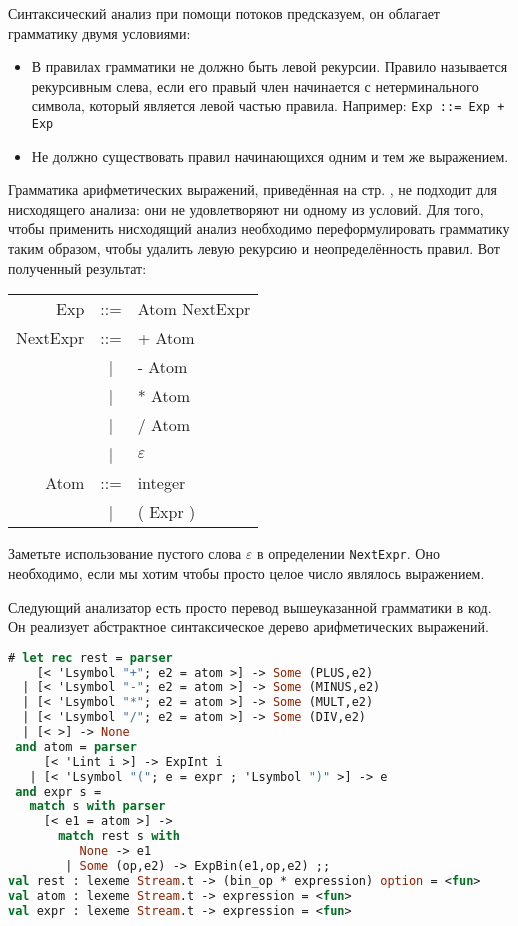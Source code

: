 Синтаксический анализ при помощи потоков предсказуем, он облагает грамматику
двумя условиями:

\begin{itemize}
	\item В правилах грамматики не должно быть левой рекурсии. Правило
называется рекурсивным слева, если его правый член начинается с нетерминального
символа, который является левой частью правила. Например: \texttt{Exp ::= Exp +
Exp}

	\item Не должно существовать правил начинающихся одним и тем же выражением.
\end{itemize}

Грамматика арифметических выражений, приведённая на стр.
\pageref{page_ref:Production_and_Recognition}, не подходит для нисходящего
анализа: они не удовлетворяют ни одному из условий. Для того, чтобы применить
нисходящий анализ необходимо переформулировать грамматику таким образом, чтобы
удалить левую рекурсию и неопределённость правил. Вот полученный результат:

\begin{center}
	\begin{tabular}{rcl}
		Exp & ::= & Atom NextExpr \\
		NextExpr & ::= & + Atom \\
		 & | & - Atom \\
		 & | & * Atom \\
		 & | & / Atom \\
 		 & | & $\varepsilon$ \\
		 Atom & ::= & integer \\
		 & | & ( Expr )
	\end{tabular}
\end{center}

Заметьте использование пустого слова $\varepsilon$ в определении
\texttt{NextExpr}. Оно необходимо, если мы хотим чтобы просто целое число
являлось выражением.

Следующий анализатор есть просто перевод вышеуказанной грамматики в код. Он
реализует абстрактное синтаксическое дерево арифметических выражений.

\begin{lstlisting}[language=OCaml]
# let rec rest = parser
    [< 'Lsymbol "+"; e2 = atom >] -> Some (PLUS,e2)
  | [< 'Lsymbol "-"; e2 = atom >] -> Some (MINUS,e2)
  | [< 'Lsymbol "*"; e2 = atom >] -> Some (MULT,e2)
  | [< 'Lsymbol "/"; e2 = atom >] -> Some (DIV,e2)
  | [< >] -> None
 and atom = parser
     [< 'Lint i >] -> ExpInt i
   | [< 'Lsymbol "("; e = expr ; 'Lsymbol ")" >] -> e
 and expr s =
   match s with parser
     [< e1 = atom >] ->
       match rest s with
          None -> e1
        | Some (op,e2) -> ExpBin(e1,op,e2) ;;
val rest : lexeme Stream.t -> (bin_op * expression) option = <fun>
val atom : lexeme Stream.t -> expression = <fun>
val expr : lexeme Stream.t -> expression = <fun>
\end{lstlisting}

